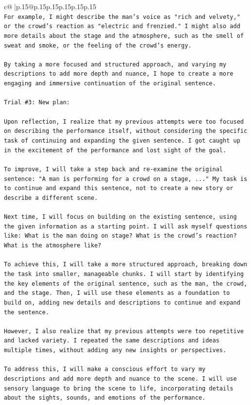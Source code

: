 \documentclass{article}
\begin{document}
{\begin{supertabular}{c@{$\;$}|p{.15\linewidth}@{}p{.15\linewidth}p{.15\linewidth}p{.15\linewidth}p{.15\linewidth}p{.15\linewidth}}
{{{\\ 
\texttt{For example, I might describe the man's voice as "rich and velvety," or the crowd's reaction as "electric and frenzied." I might also add more details about the stage and the atmosphere, such as the smell of sweat and smoke, or the feeling of the crowd's energy.} \\
\\ 
\texttt{By taking a more focused and structured approach, and varying my descriptions to add more depth and nuance, I hope to create a more engaging and immersive continuation of the original sentence.} \\
\\ 
\texttt{Trial \#3: New plan: } \\
\\ 
\texttt{Upon reflection, I realize that my previous attempts were too focused on describing the performance itself, without considering the specific task of continuing and expanding the given sentence. I got caught up in the excitement of the performance and lost sight of the goal.} \\
\\ 
\texttt{To improve, I will take a step back and re{-}examine the original sentence: "A man is performing for a crowd on a stage, ..." My task is to continue and expand this sentence, not to create a new story or describe a different scene.} \\
\\ 
\texttt{Next time, I will focus on building on the existing sentence, using the given information as a starting point. I will ask myself questions like: What is the man doing on stage? What is the crowd's reaction? What is the atmosphere like?} \\
\\ 
\texttt{To achieve this, I will take a more structured approach, breaking down the task into smaller, manageable chunks. I will start by identifying the key elements of the original sentence, such as the man, the crowd, and the stage. Then, I will use these elements as a foundation to build on, adding new details and descriptions to continue and expand the sentence.} \\
\\ 
\texttt{However, I also realize that my previous attempts were too repetitive and lacked variety. I repeated the same descriptions and ideas multiple times, without adding any new insights or perspectives.} \\
\\ 
\texttt{To address this, I will make a conscious effort to vary my descriptions and add more depth and nuance to the scene. I will use sensory language to bring the scene to life, incorporating details about the sights, sounds, and emotions of the performance.} \\
}}}
\end{supertabular}}
\end{document}

